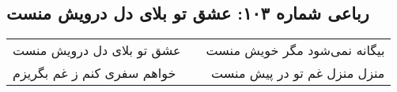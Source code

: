\begin{center}
\section*{رباعی شماره ۱۰۳: عشق تو بلای دل درویش منست}
\label{sec:sh103}
\begin{longtable}{l p{0.5cm} r}
عشق تو بلای دل درویش منست
&&
بیگانه نمی‌شود مگر خویش منست
\\
خواهم سفری کنم ز غم بگریزم
&&
منزل منزل غم تو در پیش منست
\\
\end{longtable}
\end{center}
